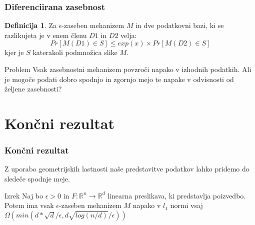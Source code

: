 \documentclass{beamer}
\newcommand{\R}{\mathbb{R}}
\theoremstyle{definition}
\newtheorem{dingli}{Definicija}
\begin{document}
\begin{frame}
	\frametitle{Diferenciirana zasebnost}
		\begin{dingli}{Za \alert{$\epsilon$-zaseben mehanizem $M$}} in dve podatkovni bazi, ki se razlikujeta je v enem členu $D1$ in $D2$ velja:
		$$Pr[M(D1) \in S] \leq exp(x) \times Pr[M(D2) \in S]$$ kjer je $S$ katerakoli podmnožica slike $M$.
	\end{dingli}
			
	\begin{block}{Problem}
		Vsak zasebnostni mehanizem povzroči napako v izhodnih podatkih. Ali je mogoče podati dobro spodnjo in zgornjo mejo te napake v odvisnosti od željene zasebnosti?
	\end{block}
\end{frame}



\section{Končni rezultat}
\begin{frame}
	\frametitle{Končni rezultat}
	Z uporabo geometrijskih lastnosti naše predstavitve podatkov lahko pridemo do sledeče spodnje meje.
	
	\begin{block}{Izrek}
		Naj bo $\epsilon > 0$ in $F: \R^n \rightarrow \R^d$ linearna preslikava, ki predstavlja poizvedbo. Potem ima vsak $\epsilon$-zaseben mehanizem $M$ napako v $l_1$ normi vsaj $\Omega(min(d*\sqrt{d}/\epsilon, d \sqrt{log(n/d)} / \epsilon))$
	\end{block}
\end{frame}

\end{document}
